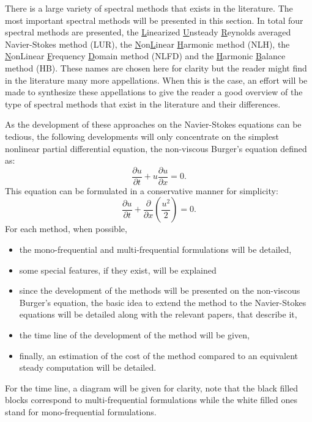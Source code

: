
There is a large variety of spectral methods that exists in the
literature. 
The most important spectral methods will be presented in this section.
In total four spectral methods are presented, 
the \underline{L}inearized \underline{U}nsteady 
\underline{R}eynolds averaged
Navier-Stokes method (LUR), 
the \underline{N}on\underline{L}inear 
\underline{H}armonic method (NLH), the \underline{N}onLinear 
\underline{F}requency \underline{D}omain
method (NLFD) and the \underline{H}armonic \underline{B}alance 
method (HB).
These names are chosen here
for clarity but the reader might find in the literature many more
appellations. When this is the case, an effort will be made to synthesize
these appellations to give the reader a good 
overview of the type of spectral methods that exist in the literature
and their differences.

As the development of these approaches on the Navier-Stokes equations
can be tedious, the following developments 
will only concentrate on the simplest
nonlinear partial differential equation, 
the non-viscous Burger's equation defined as:
\begin{equation}
	\frac{\partial u}{\partial t} + 
	u \frac{\partial u}{\partial x} = 
	0.
	\label{eq:sm_nonlinear_convection}
\end{equation}
This equation can be formulated in a conservative manner for simplicity:
\begin{equation}
	\frac{\partial u}{\partial t} + 
	\frac{\partial}{\partial x} \left( \frac{u^2}{2} \right) = 
	0.
	\label{eq:sm_nonlinear_convection_conservative}
\end{equation}
For each method, when possible,
\begin{itemize}
 	\item the mono-frequential and multi-frequential 
 	formulations will be detailed,
 	\item some special features, if they exist, will be explained
 	\item since the development of the methods will be 
 	presented on the non-viscous 
 	Burger's equation, 
	the basic idea to extend the method to the Navier-Stokes
	equations will be detailed along with the relevant papers,
	that describe it,
	\item the time line of the development 
	of the method will be given,
	\item finally, an estimation of the cost of the method 
	compared to an equivalent steady computation will be detailed.
\end{itemize}
For the time line, a diagram will be given for clarity, note
that the black filled blocks correspond to multi-frequential
formulations while the white filled ones stand for mono-frequential
formulations.
